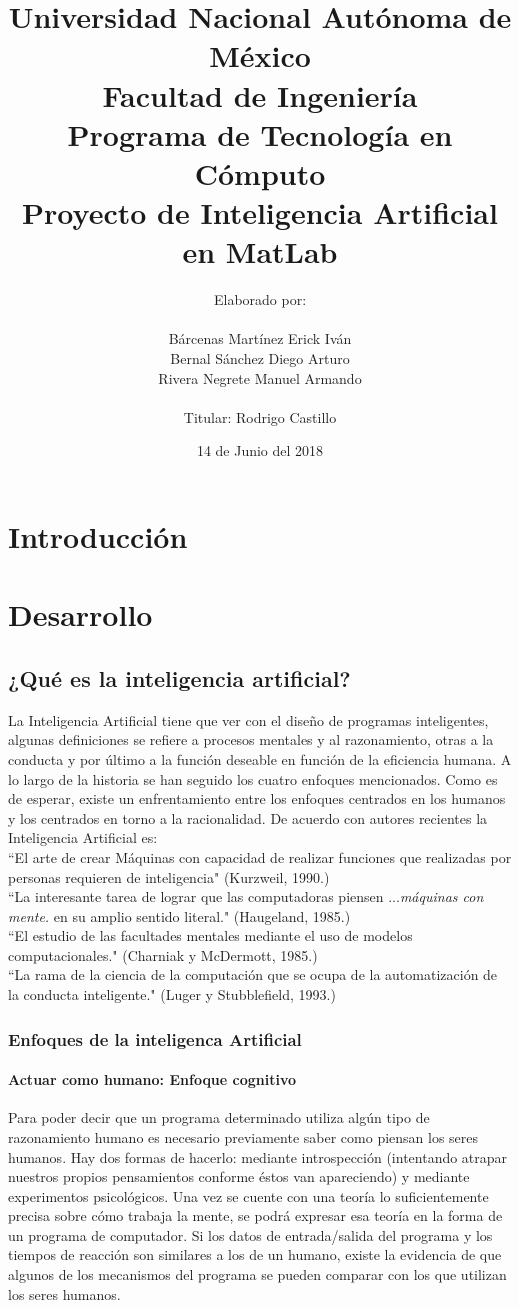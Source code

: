 \documentclass[12pt,a4paper]{report}
\author{Elaborado por:\\\\Bárcenas Martínez Erick Iván \\ Bernal Sánchez Diego Arturo \\ Rivera Negrete Manuel Armando\\\\Titular: Rodrigo Castillo}
\date{14 de Junio del 2018}
\title{Universidad Nacional Autónoma de México\\Facultad de Ingeniería\\Programa de Tecnología en Cómputo\\Proyecto de Inteligencia Artificial en MatLab}
\begin{document}
\maketitle
\part{Introducción}
\part{Desarrollo}
\chapter{¿Qué es la inteligencia artificial?}
La Inteligencia Artificial tiene que ver con el diseño de  programas inteligentes, algunas definiciones se refiere a procesos mentales y al razonamiento, otras a la conducta y por último a la  función deseable en función de la eficiencia humana. A lo largo de la historia se han seguido los cuatro enfoques mencionados. Como es
de esperar, existe un enfrentamiento entre los enfoques centrados en los humanos y los
centrados en torno a la racionalidad. De acuerdo con autores recientes la Inteligencia Artificial es: \\``El arte de crear Máquinas con capacidad de realizar funciones que realizadas por personas requieren de inteligencia" (Kurzweil, 1990.)\\``La interesante tarea de lograr que las computadoras piensen ...\textit{máquinas con mente.} en su amplio sentido literal." (Haugeland, 1985.)\\``El estudio de las facultades mentales mediante el uso de modelos computacionales." (Charniak y McDermott, 1985.)\\``La rama de la ciencia de la computación que se ocupa de la automatización de la conducta inteligente." (Luger y Stubblefield, 1993.)
\section{Enfoques de la inteligenca Artificial}
\subsection*{Actuar como humano: Enfoque cognitivo}
Para poder decir que un programa determinado utiliza algún tipo de razonamiento humano es necesario previamente saber como piensan los seres humanos. Hay dos formas de hacerlo: mediante introspección (intentando atrapar nuestros propios pensamientos conforme éstos van apareciendo) y mediante experimentos psicológicos. Una vez se cuente con una teoría lo
suficientemente precisa sobre cómo trabaja la mente, se podrá expresar esa teoría en la
forma de un programa de computador. Si los datos de entrada/salida del programa y los
tiempos de reacción son similares a los de un humano, existe la evidencia de que algunos de los mecanismos del programa se pueden comparar con los que utilizan los seres
humanos.
\end{document}
